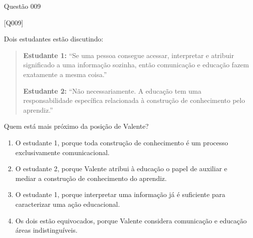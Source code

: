 \documentclass[xcolor=dvipsnames,table]{beamer}
\begin{document}
    \begin{frame}{Questão 009}

		\footnotesize

    \begin{block}{[Q009]}
    
    Dois estudantes estão discutindo:

    \begin{quote}
    \textbf{Estudante 1:} ``Se uma pessoa consegue acessar, interpretar e atribuir significado a uma informação sozinha, então comunicação e educação fazem exatamente a mesma coisa.''

    \textbf{Estudante 2:} ``Não necessariamente. A educação tem uma responsabilidade específica relacionada à construção de conhecimento pelo aprendiz.''
    \end{quote}

   Quem está mais próximo da posição de Valente?

    \end{block}

    \begin{enumerate}[label=(\Alph*)]

        \item O estudante 1, porque toda construção de conhecimento é um processo exclusivamente comunicacional.

        \item O estudante 2, porque Valente atribui à educação o papel de auxiliar e mediar a construção de conhecimento do aprendiz.

        \item O estudante 1, porque interpretar uma informação já é suficiente para caracterizar uma ação educacional.

        \item Os dois estão equivocados, porque Valente considera comunicação e educação áreas indistinguíveis.

    \end{enumerate}

\end{frame}
\end{document}
